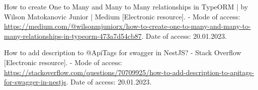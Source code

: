 \documentclass[12pt, a4paper, simple]{eskdtext}
\begin{document}
\begin{thebibliography}{}
    How to create One to Many and Many to Many relationships in TypeORM | by Wilson Matokanovic Junior | Medium
    [Electronic resource]. -
    Mode of access:
    \url{https://medium.com/@wilsonmjuniorx/how-to-create-one-to-many-and-many-to-many-relationships-in-typeorm-473a7d54cb87}.
    Date of access: 20.01.2023.

    How to add description to @ApiTags for swagger in NestJS? - Stack Overflow
    [Electronic resource]. -
    Mode of access:
    \url{https://stackoverflow.com/questions/70709925/how-to-add-description-to-apitags-for-swagger-in-nestjs}.
    Date of access: 20.01.2023.

  \end{thebibliography}
  \endgroup
\end{document}
